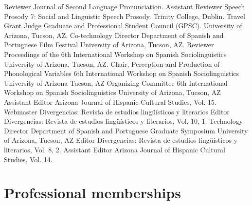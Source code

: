\documentclass[11pt,letterpaper]{moderncv}
\begin{document}
        {Reviewer}
        {Journal of Second Language Pronunciation.}
        {}
        {}
        {}
        {Assistant Reviewer}
        {Speech Prosody 7: Social and Linguistic Speech Prosody.}
        {}
        {}
        {Trinity College, Dublin.}
        {Travel Grant Judge}
        {Graduate and Professional Student Council (GPSC).}
        {}
        {}
        {University of Arizona, Tucson, AZ.}
        {Co-technology Director}
        {Department of Spanish and Portuguese Film Festival}
        {}
        {}
        {University of Arizona, Tucson, AZ.}
        {Reviewer}
        {Proceedings of the 6th International Workshop on Spanish Sociolinguistics}
        {}
        {}
        {University of Arizona, Tucson, AZ.}
        {Chair, Perception and Production of Phonological Variables}
        {6th International Workshop on Spanish Sociolinguistics}
        {University of Arizona}
        {Tucson, AZ}
        {}
        {Organizing Committee}
        {6th International Workshop on Spanish Sociolinguistics}
        {}
        {}
        {University of Arizona, Tucson, AZ}
        {Assistant Editor}
        {Arizona Journal of Hispanic Cultural Studies, Vol. 15.}
        {}
        {}
        {}
        {Webmaster}
        {Divergencias: Revista de estudios ling\"u\'isticos y literarios}
        {}
        {}
        {}
        {Editor}
        {Divergencias: Revista de estudios ling\"u\'isticos y literarios, Vol. 10, 1.}
        {}
        {}
        {}
        {Technology Director}
        {Department of Spanish and Portuguese Graduate Symposium}
        {}
        {}
        {University of Arizona, Tucson, AZ}
        {Editor}
        {Divergencias: Revista de estudios ling\"u\'isticos y literarios, Vol. 8, 2.}
        {}
        {}
        {}
        {Assistant Editor}
        {Arizona Journal of Hispanic Cultural Studies, Vol. 14.}
        {}
        {}
        {}




\section{Professional memberships}

\end{document}
